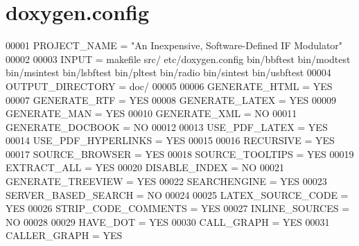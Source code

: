 \hypertarget{doxygen_8config_source}{\section{doxygen.\+config}
\label{doxygen_8config_source}
}

\begin{DoxyCode}
00001 PROJECT\_NAME = "An Inexpensive, Software-Defined IF Modulator"
00002 
00003 INPUT = makefile src/ etc/doxygen.config bin/bbftest bin/modtest bin/msintest bin/lsbftest bin/pltest
       bin/radio bin/sintest bin/usbftest
00004 OUTPUT\_DIRECTORY = doc/
00005 
00006 GENERATE\_HTML = YES
00007 GENERATE\_RTF = YES
00008 GENERATE\_LATEX = YES
00009 GENERATE\_MAN = YES
00010 GENERATE\_XML = NO
00011 GENERATE\_DOCBOOK = NO
00012 
00013 USE\_PDF\_LATEX = YES
00014 USE\_PDF\_HYPERLINKS = YES
00015 
00016 RECURSIVE = YES
00017 SOURCE\_BROWSER = YES
00018 SOURCE\_TOOLTIPS = YES
00019 EXTRACT\_ALL = YES
00020 DISABLE\_INDEX = NO
00021 GENERATE\_TREEVIEW = YES
00022 SEARCHENGINE = YES
00023 SERVER\_BASED\_SEARCH = NO
00024 
00025 LATEX\_SOURCE\_CODE = YES
00026 STRIP\_CODE\_COMMENTS = YES
00027 INLINE\_SOURCES = NO
00028 
00029 HAVE\_DOT = YES
00030 CALL\_GRAPH = YES
00031 CALLER\_GRAPH = YES
\end{DoxyCode}
